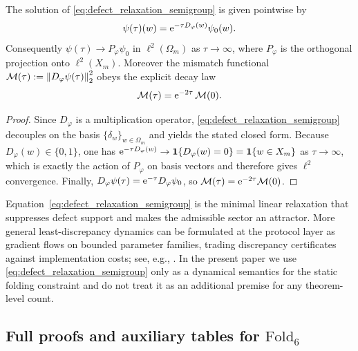 \begin{proposition}\label{prop:defect_relaxation_to_phi}
The solution of \eqref{eq:defect_relaxation_semigroup} is given pointwise by
\[
\psi(\tau)(w)=\mathrm{e}^{-\tau D_\varphi(w)}\psi_0(w).
\]
Consequently $\psi(\tau)\to P_\varphi\psi_0$ in $\ell^2(\Omega_m)$ as $\tau\to\infty$, where $P_\varphi$ is the orthogonal projection onto $\ell^2(X_m)$.
Moreover the mismatch functional $\mathcal{M}(\tau):=\left\lVert D_\varphi\psi(\tau)\right\rVert_2^2$ obeys the explicit decay law
\[
\mathcal{M}(\tau)=\mathrm{e}^{-2\tau}\,\mathcal{M}(0).
\]
\end{proposition}
\begin{proof}
Since $D_\varphi$ is a multiplication operator, \eqref{eq:defect_relaxation_semigroup} decouples on the basis $\{\delta_w\}_{w\in\Omega_m}$ and yields the stated closed form.
Because $D_\varphi(w)\in\{0,1\}$, one has $\mathrm{e}^{-\tau D_\varphi(w)}\to \mathbf{1}\{D_\varphi(w)=0\}=\mathbf{1}\{w\in X_m\}$ as $\tau\to\infty$, which is exactly the action of $P_\varphi$ on basis vectors and therefore gives $\ell^2$ convergence.
Finally, $D_\varphi\psi(\tau)=\mathrm{e}^{-\tau}D_\varphi\psi_0$, so $\mathcal{M}(\tau)=\mathrm{e}^{-2\tau}\mathcal{M}(0)$.
\end{proof}

\begin{remark}\label{rem:stability_relaxation_context}
Equation~\eqref{eq:defect_relaxation_semigroup} is the minimal linear relaxation that suppresses defect support and makes the admissible sector an attractor.
More general least-discrepancy dynamics can be formulated at the protocol layer as gradient flows on bounded parameter families, trading discrepancy certificates against implementation costs; see, e.g., \cite{Ma2025CAP,Ma2025HHU,Ma2025HPT,Ma2025CAPII}.
In the present paper we use \eqref{eq:defect_relaxation_semigroup} only as a dynamical semantics for the static folding constraint and do not treat it as an additional premise for any theorem-level count.
\end{remark}

\subsection{Full proofs and auxiliary tables for \texorpdfstring{$\mathrm{Fold}_6$}{Fold6}}
\label{app:fold6_full_proofs}

